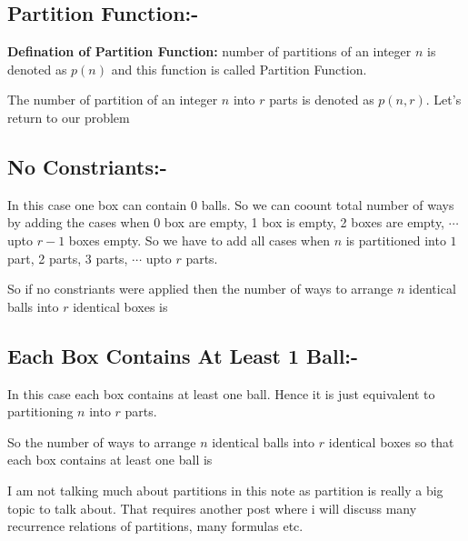 \documentclass[12pt]{article}
\begin{document}
\subsection{Partition Function:-}
\textbf{Defination of Partition Function:} number of partitions of an integer $n $ is denoted as $p (n) $ and this function is called Partition Function. 

The number of partition of an integer $n $ into $r$ parts is denoted as $p (n,r) $. Let's return to our problem
\subsection{No Constriants:-}
In this case one box can contain 0 balls. So we can coount total number of ways by adding the cases when 0 box are empty, 1 box is empty, 2 boxes are empty, $\cdots $ upto $r-1$ boxes empty. So we have to add all cases when $n $ is partitioned into $1$ part, 2 parts, 3 parts, $\cdots$ upto $r $ parts. 

So if no constriants were applied then the number of ways to arrange $n $ identical  balls into $r $ identical boxes is  

\subsection{Each Box Contains At Least 1 Ball:-}

In this case each box contains at least one ball. Hence it is just equivalent to partitioning $n $ into $r $ parts. 

So the number of ways to arrange $n $ identical   balls into $r $ identical boxes so that each box contains at least one ball is 

I am not talking much about partitions in this note as partition is really a big topic to talk about. That requires another post where i will discuss many recurrence relations of partitions, many formulas etc. 
\end{document}
